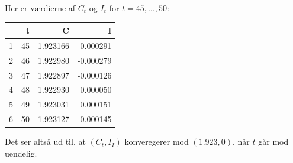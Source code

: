 \documentclass[12pt]{article}
\begin{document}
Her er værdierne af $C_t$ og $I_t$ for $t=45,...,50$:

\begin{table}[ht]
\centering
\begin{tabular}{rrrr}
  \hline
 & t & C & I \\ 
  \hline
1 &      45 & 1.923166 & -0.000291 \\ 
  2 &      46 & 1.922980 & -0.000279 \\ 
  3 &      47 & 1.922897 & -0.000126 \\ 
  4 &      48 & 1.922930 & 0.000050 \\ 
  5 &      49 & 1.923031 & 0.000151 \\ 
  6 &      50 & 1.923127 & 0.000145 \\ 
   \hline
\end{tabular}
\end{table}

Det ser altså ud til, at $(C_t, I_I)$ konveregerer mod $(1.923, 0)$, når $t$ går mod uendelig.
\end{document}
